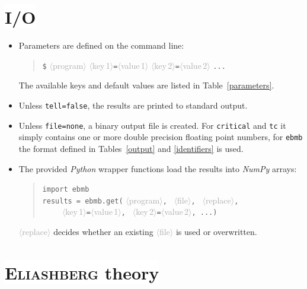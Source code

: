 \documentclass[a4paper]{article}
\def\dummy#1{\textcolor{darkgray}{$\langle$#1$\rangle$}}
\def\headline#1{\section*{%
   \normalsize\normalfont%
   \rlap{\rule[0.5ex]\textwidth{0.4pt}}%
   \qquad\colorbox{white}{#1}%
   }}
\begin{document}
   \headline{I/O}

   \begin{itemize}
      \item
         Parameters are defined on the command line:
         \begin{quote}
            \verb|$| \dummy{program}
               \dummy{key\,1}\verb|=|\dummy{value\,1}
               \dummy{key\,2}\verb|=|\dummy{value\,2} \verb|...|
         \end{quote}
         The available keys and default values are listed in
         Table~\ref{parameters}.

      \item
         Unless \texttt{tell=false}, the results are printed to standard output.

      \item
         Unless \texttt{file=none}, a binary output file is created. For
         \texttt{critical} and \texttt{tc} it simply contains one or more double
         precision floating point numbers, for \texttt{ebmb} the format defined
         in Tables~\ref{output} and \ref{identifiers} is used.

      \item
         The provided \emph{Python} wrapper functions load the results into
         \emph{NumPy} arrays:
         \begin{quote}
            \verb|import ebmb| \\
            \verb|results = ebmb.get(|%
            \dummy{program}\verb|, |%
            \dummy{file}\verb|, |%
            \dummy{replace}\verb|,| \\
            \verb|    |%
               \dummy{key\,1}\verb|=|\dummy{value\,1}\verb|, |%
               \dummy{key\,2}\verb|=|\dummy{value\,2}\verb|, ...|\verb|)|
         \end{quote}
         \dummy{replace} decides whether an existing \dummy{file} is used or
         overwritten.
   \end{itemize}

   \headline{\textsc{Eliashberg} theory}
\end{document}
